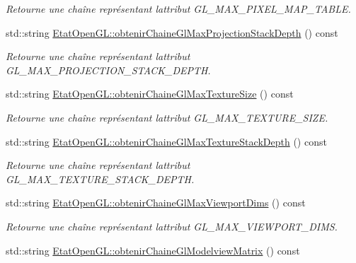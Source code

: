 \begin{DoxyCompactItemize}
\begin{DoxyCompactList}\small\item\em Retourne une chaîne représentant l\textquotesingle{}attribut G\+L\+\_\+\+M\+A\+X\+\_\+\+P\+I\+X\+E\+L\+\_\+\+M\+A\+P\+\_\+\+T\+A\+B\+L\+E. \end{DoxyCompactList}\item 
std\+::string \hyperlink{group__utilitaire_ga8c2d3530aa09867d9c01d8433839011e}{Etat\+Open\+G\+L\+::obtenir\+Chaine\+Gl\+Max\+Projection\+Stack\+Depth} () const 
\begin{DoxyCompactList}\small\item\em Retourne une chaîne représentant l\textquotesingle{}attribut G\+L\+\_\+\+M\+A\+X\+\_\+\+P\+R\+O\+J\+E\+C\+T\+I\+O\+N\+\_\+\+S\+T\+A\+C\+K\+\_\+\+D\+E\+P\+T\+H. \end{DoxyCompactList}\item 
std\+::string \hyperlink{group__utilitaire_gaeba7eaad6682c2c4aa8925501601c606}{Etat\+Open\+G\+L\+::obtenir\+Chaine\+Gl\+Max\+Texture\+Size} () const 
\begin{DoxyCompactList}\small\item\em Retourne une chaîne représentant l\textquotesingle{}attribut G\+L\+\_\+\+M\+A\+X\+\_\+\+T\+E\+X\+T\+U\+R\+E\+\_\+\+S\+I\+Z\+E. \end{DoxyCompactList}\item 
std\+::string \hyperlink{group__utilitaire_ga9aac1a0891487831a30125fca75bec93}{Etat\+Open\+G\+L\+::obtenir\+Chaine\+Gl\+Max\+Texture\+Stack\+Depth} () const 
\begin{DoxyCompactList}\small\item\em Retourne une chaîne représentant l\textquotesingle{}attribut G\+L\+\_\+\+M\+A\+X\+\_\+\+T\+E\+X\+T\+U\+R\+E\+\_\+\+S\+T\+A\+C\+K\+\_\+\+D\+E\+P\+T\+H. \end{DoxyCompactList}\item 
std\+::string \hyperlink{group__utilitaire_ga0dad12ef08cd32b9fb94e214f00a95a9}{Etat\+Open\+G\+L\+::obtenir\+Chaine\+Gl\+Max\+Viewport\+Dims} () const 
\begin{DoxyCompactList}\small\item\em Retourne une chaîne représentant l\textquotesingle{}attribut G\+L\+\_\+\+M\+A\+X\+\_\+\+V\+I\+E\+W\+P\+O\+R\+T\+\_\+\+D\+I\+M\+S. \end{DoxyCompactList}\item 
std\+::string \hyperlink{group__utilitaire_ga44c62c93a914527f821b2aef913fada7}{Etat\+Open\+G\+L\+::obtenir\+Chaine\+Gl\+Modelview\+Matrix} () const 

\end{DoxyCompactItemize}
